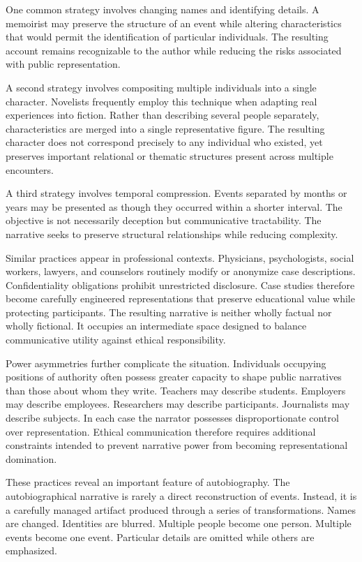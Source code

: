 \documentclass[11pt]{article}
\theoremstyle{plain}
\begin{document}
One common strategy involves changing names and identifying details. A memoirist may preserve the structure of an event while altering characteristics that would permit the identification of particular individuals. The resulting account remains recognizable to the author while reducing the risks associated with public representation.

A second strategy involves compositing multiple individuals into a single character. Novelists frequently employ this technique when adapting real experiences into fiction. Rather than describing several people separately, characteristics are merged into a single representative figure. The resulting character does not correspond precisely to any individual who existed, yet preserves important relational or thematic structures present across multiple encounters.

A third strategy involves temporal compression. Events separated by months or years may be presented as though they occurred within a shorter interval. The objective is not necessarily deception but communicative tractability. The narrative seeks to preserve structural relationships while reducing complexity.

Similar practices appear in professional contexts. Physicians, psychologists, social workers, lawyers, and counselors routinely modify or anonymize case descriptions. Confidentiality obligations prohibit unrestricted disclosure. Case studies therefore become carefully engineered representations that preserve educational value while protecting participants. The resulting narrative is neither wholly factual nor wholly fictional. It occupies an intermediate space designed to balance communicative utility against ethical responsibility.

Power asymmetries further complicate the situation. Individuals occupying positions of authority often possess greater capacity to shape public narratives than those about whom they write. Teachers may describe students. Employers may describe employees. Researchers may describe participants. Journalists may describe subjects. In each case the narrator possesses disproportionate control over representation. Ethical communication therefore requires additional constraints intended to prevent narrative power from becoming representational domination.

These practices reveal an important feature of autobiography. The autobiographical narrative is rarely a direct reconstruction of events. Instead, it is a carefully managed artifact produced through a series of transformations. Names are changed. Identities are blurred. Multiple people become one person. Multiple events become one event. Particular details are omitted while others are emphasized.
\end{document}
